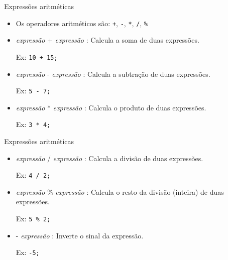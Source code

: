 \documentclass[handout]{beamer}
\begin{document}
\begin{frame}[fragile]{Expressões aritméticas}

    \begin{itemize}[<+->]
        \item Os operadores aritméticos são: \texttt{+}, \texttt{-}, \texttt{*}, \texttt{/}, \texttt{\%}
        \item {\it expressão}  + {\it expressão} : Calcula a soma de duas expressões.

        Ex: {\tt 10 + 15;}

        \item {\it expressão}  - {\it expressão} : Calcula a subtração de duas expressões.

        Ex: {\tt 5 - 7;}

        \item {\it expressão}  * {\it expressão} : Calcula o produto de duas expressões.

        Ex: {\tt 3 * 4;}
    \end{itemize}

\end{frame}

\begin{frame}[fragile]{Expressões aritméticas}

    \begin{itemize}[<+->]
        \item {\it expressão}  / {\it expressão} : Calcula a divisão de duas expressões.

        Ex: {\tt 4 / 2;}

        \item {\it expressão}  \% {\it expressão} : Calcula o resto da divisão (inteira) de duas expressões.

        Ex: {\tt 5 \% 2;}

        \item - {\it expressão} : Inverte o sinal da expressão.

        Ex: {\tt -5;}
    \end{itemize}

\end{frame}
\end{document}
